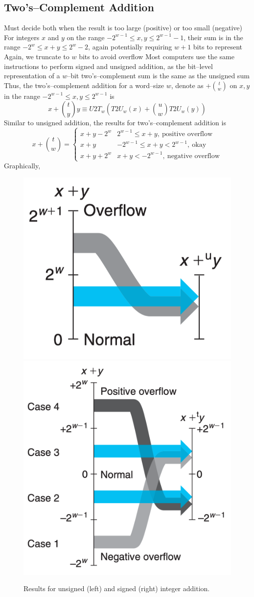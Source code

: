 \documentclass[../bryant_comp_sys.tex]{subfiles}
\begin{document}
                \subsection{Two's--Complement Addition}
                    \begin{outline}
                        \1 Must decide both when the result is too large (positive) or too small (negative)
                        \1 For integers \( x \) and \( y \) on the range \( -2^{w-1} \leq x,y \leq 2^{w-1}-1 \), their sum is in the range \( -2^w \leq x + y \leq 2^w - 2 \), again potentially requiring \( w+1 \) bits to represent
                            \2 Again, we truncate to \( w \) bits to avoid overflow
                        \1 Most computers use the same instructions to perform signed and unsigned addition, as the bit--level representation of a \( w \)--bit two's--complement sum is the same as the unsigned sum
                            \2 Thus, the two's--complement addition for a word--size \( w \), denote as \( +\binom{t}{w} \) on \( x, y \) in the range \( -2^{w-1} \leq x,y \leq 2^{w-1} \) is
                                \[
                                    x + \binom{t}{y}y \equiv U2T_w(T2U_w(x) + \binom{u}{w} T2U_w(y))
                                \]
                        \1 Similar to unsigned addition, the results for two's--complement addition is
                            \[
                                x + \binom{t}{w} = \begin{cases} x + y - 2^w & 2^{w-1} \leq x + y,~\text{positive overflow} \\ x + y & -2^{w-1} \leq x + y < 2^{w-1},~\text{okay} \\ x + y + 2^w & x + y < -2^{w-1},~\text{negative overflow}\end{cases}
                            \]
                        \1 Graphically,
                            \begin{figure}[h]
                                \centering
                                \includegraphics[width=0.25\linewidth]{ch2/figs/int_add_unsigned.png}
                                \includegraphics[width=0.3\linewidth]{ch2/figs/int_add_signed.png}
                                \caption{Results for unsigned (left) and signed (right) integer addition.}
                                \label{fig:intAdd}
                            \end{figure}
                    \end{outline}
                
\end{document}
